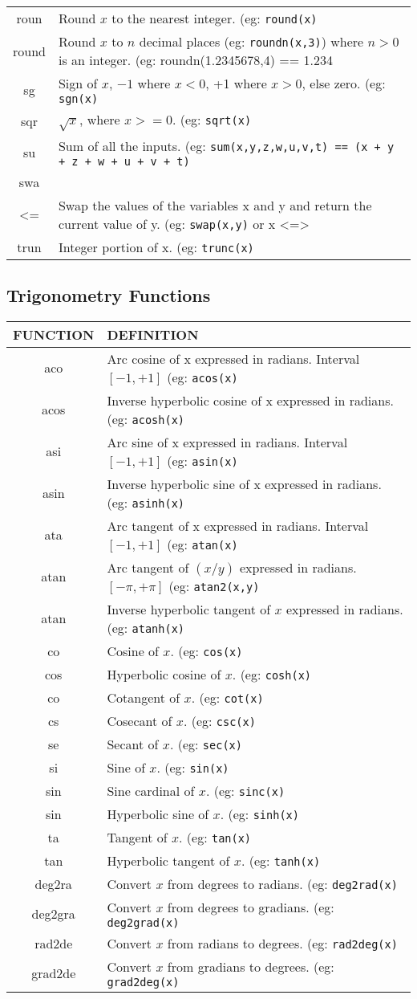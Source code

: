 \begin{tabular}{|c|p{}|}
roun & Round $x$ to the nearest integer. (eg: \verb'round(x)'\tabularnewline
round & Round $x$ to $n$ decimal places (eg: \verb'roundn(x,3)') where
$n>0$ is an integer. (eg: roundn(1.2345678,4) == 1.234\tabularnewline
sg & Sign of $x$, $-1$ where $x<0$, +1 where $x>0$, else zero. (eg:
\verb'sgn(x)'\tabularnewline
sqr & $\sqrt{x}$, where $x>=0$. (eg: \verb'sqrt(x)'\tabularnewline
su & Sum of all the inputs. (eg: \verb'sum(x,y,z,w,u,v,t) == (x + y + z + w + u + v + t)'\tabularnewline
swa & \tabularnewline
\textless = & Swap the values of the variables x and y and return the current value
of y. (eg: \verb'swap(x,y)' or x \textless =\textgreater{} \tabularnewline
trun & Integer portion of x. (eg: \verb'trunc(x)'\tabularnewline
\hline 
\end{tabular}

\subsection{Trigonometry Functions}

\begin{tabular}{|c|p{}|}
\hline 
FUNCTION  & DEFINITION\tabularnewline
\hline 
aco & Arc cosine of x expressed in radians. Interval $[-1,+1]$ (eg: \verb'acos(x)'\tabularnewline
acos & Inverse hyperbolic cosine of x expressed in radians. (eg: \verb'acosh(x)'\tabularnewline
asi & Arc sine of x expressed in radians. Interval $[-1,+1]$ (eg: \verb'asin(x)'\tabularnewline
asin & Inverse hyperbolic sine of x expressed in radians. (eg: \verb'asinh(x)'\tabularnewline
ata & Arc tangent of x expressed in radians. Interval $[-1,+1]$ (eg: \verb'atan(x)'\tabularnewline
atan & Arc tangent of $(x/y)$ expressed in radians. $[-\pi,+\pi]$ (eg:
\verb'atan2(x,y)'\tabularnewline
atan & Inverse hyperbolic tangent of $x$ expressed in radians. (eg: \verb'atanh(x)'\tabularnewline
co & Cosine of $x$. (eg: \verb'cos(x)'\tabularnewline
cos & Hyperbolic cosine of $x$. (eg: \verb'cosh(x)'\tabularnewline
co & Cotangent of $x$. (eg: \verb'cot(x)'\tabularnewline
cs & Cosecant of $x$. (eg: \verb'csc(x)'\tabularnewline
se & Secant of $x$. (eg: \verb'sec(x)'\tabularnewline
si & Sine of $x$. (eg: \verb'sin(x)'\tabularnewline
sin & Sine cardinal of $x$. (eg: \verb'sinc(x)'\tabularnewline
sin & Hyperbolic sine of $x$. (eg: \verb'sinh(x)'\tabularnewline
ta & Tangent of $x$. (eg: \verb'tan(x)'\tabularnewline
tan & Hyperbolic tangent of $x$. (eg: \verb'tanh(x)'\tabularnewline
deg2ra & Convert $x$ from degrees to radians. (eg: \verb'deg2rad(x)'\tabularnewline
deg2gra & Convert $x$ from degrees to gradians. (eg: \verb'deg2grad(x)'\tabularnewline
rad2de & Convert $x$ from radians to degrees. (eg: \verb'rad2deg(x)'\tabularnewline
grad2de & Convert $x$ from gradians to degrees. (eg: \verb'grad2deg(x)'\tabularnewline
\hline 
\end{tabular}

